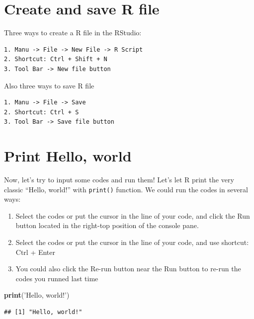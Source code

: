 \documentclass[]{book}
\newenvironment{Shaded}{\begin{snugshade}}{\end{snugshade}}
\newcommand{\KeywordTok}[1]{\textcolor[rgb]{0.13,0.29,0.53}{\textbf{#1}}}
\newcommand{\NormalTok}[1]{#1}
\newcommand{\StringTok}[1]{\textcolor[rgb]{0.31,0.60,0.02}{#1}}
\providecommand{\tightlist}{%
  \setlength{\itemsep}{0pt}\setlength{\parskip}{0pt}}
\begin{document}
\hypertarget{create-and-save-r-file}{%
\section{Create and save R file}\label{create-and-save-r-file}}

Three ways to create a R file in the RStudio:

\begin{verbatim}
1. Manu -> File -> New File -> R Script
2. Shortcut: Ctrl + Shift + N
3. Tool Bar -> New file button
\end{verbatim}

Also three ways to save R file

\begin{verbatim}
1. Manu -> File -> Save
2. Shortcut: Ctrl + S
3. Tool Bar -> Save file button
\end{verbatim}

\hypertarget{print-hello-world}{%
\section{Print Hello, world}\label{print-hello-world}}

Now, let's try to input some codes and run them! Let's let R print the very classic ``Hello, world!'' with \texttt{print()} function.
We could run the codes in several ways:

\begin{enumerate}
\def\labelenumi{\arabic{enumi}.}
\tightlist
\item
  Select the codes or put the cursor in the line of your code, and click the Run button located in the right-top position of the console pane.
\item
  Select the codes or put the cursor in the line of your code, and use shortcut: Ctrl + Enter
\item
  You could also click the Re-run button near the Run button to re-run the codes you runned last time
\end{enumerate}

\begin{Shaded}
\begin{Highlighting}[]
\KeywordTok{print}\NormalTok{(}\StringTok{'Hello, world!'}\NormalTok{)}
\end{Highlighting}
\end{Shaded}

\begin{verbatim}
## [1] "Hello, world!"
\end{verbatim}
\end{document}
